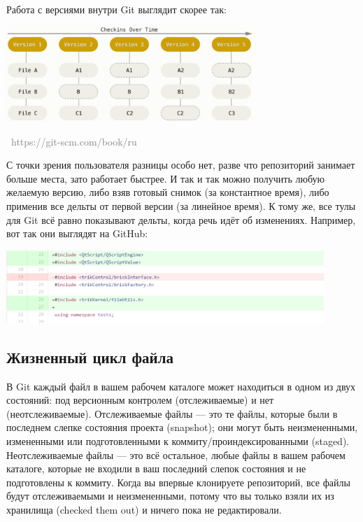 \documentclass[a5paper]{article}
\newcommand{\attribution}[1] {
\vspace{-5mm}\begin{flushright}\begin{scriptsize}\textcolor{gray}{\textcopyright\, #1}\end{scriptsize}\end{flushright}
}
\begin{document}
Работа с версиями внутри Git выглядит скорее так:

\begin{center}
	\includegraphics[width=0.7\textwidth]{snapshotVersioning.png}
	\attribution{https://git-scm.com/book/ru}
\end{center}

С точки зрения пользователя разницы особо нет, разве что репозиторий занимает больше места, зато работает быстрее. И так и так можно получить любую желаемую версию, либо взяв готовый снимок (за константное время), либо применив все дельты от первой версии (за линейное время). К тому же, все тулы для Git всё равно показывают дельты, когда речь идёт об изменениях. Например, вот так они выглядят на GitHub:

\begin{center}
	\includegraphics[width=0.9\textwidth]{delta.png}
\end{center}

\subsection{Жизненный цикл файла}

В Git каждый файл в вашем рабочем каталоге может находиться в одном из двух состояний: под версионным контролем (отслеживаемые) и нет (неотслеживаемые). Отслеживаемые файлы --- это те файлы, которые были в последнем слепке состояния проекта (snapshot); они могут быть неизмененными, измененными или подготовленными к коммиту/проиндексированными (staged). Неотслеживаемые файлы --- это всё остальное, любые файлы в вашем рабочем каталоге, которые не входили в ваш последний слепок состояния и не подготовлены к коммиту. Когда вы впервые клонируете репозиторий, все файлы будут отслеживаемыми и неизмененными, потому что вы только взяли их из хранилища (checked them out) и ничего пока не редактировали.
\end{document}
